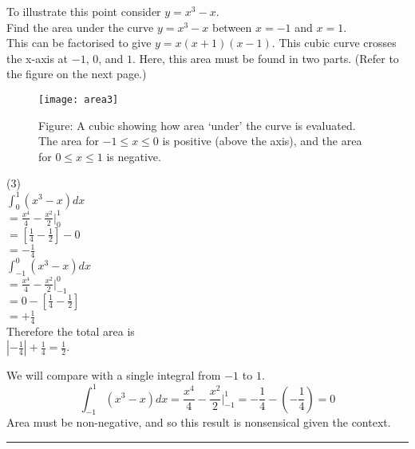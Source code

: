 To illustrate this point consider $y =x^{3} -x$. \medskip\\
\example Find the area under the curve $y =x^{3} -x$ between $x = -1$ and $x =1$.\medskip\\
\solution This can be factorised to give $y =x (x +1) (x -1)$. This cubic curve crosses the x-axis at $ -1$, $0$, and $1$. Here, this area must be found in two parts. (Refer to the figure on the next page.)\clearpage
\begin{SCfigure}[1][h]
	\texttt{[image: area3]}
	\caption*{Figure: A cubic showing how area `under' the curve is evaluated. The area for $-1\leq x\leq 0$ is positive (above the axis), and the area for $0\leq x\leq 1$ is negative.}
\end{SCfigure}
\begin{tasks}(3)
	\task[\phantom{a}]\\ 
	$\int _{0}^{1}(x^{3} -x) dx$\\
	$=\frac{x^4}{4}-\frac{x^2}{2}\vert_{0}^1$\\
	$=[\frac{1}{4}-\frac{1}{2}]-0$\\
	$=-\frac{1}{4}$
	\task[\phantom{a}]\\ 
	$\int _{ -1}^{0}(x^{3} -x) d x$ \\
	$=\frac{x^4}{4}-\frac{x^2}{2}\vert_{-1}^0$\\
	$=0-[\frac{1}{4}-\frac{1}{2}]$\\
	$=+\frac{1}{4}$
	\task[\phantom{a}]\\ 
	Therefore the total area is\\
	 $|-\frac{1}{4}|+\frac{1}{4}=\frac{1}{2}$.
\end{tasks}
We will compare with a single integral from $-1$ to $1$.	
\[\int _{ -1}^{1}(x^{3} -x) d x=\frac{x^4}{4}-\frac{x^2}{2}\vert_{-1}^1 =-\frac{1}{4}-(-\frac{1}{4})=0\]
Area must be non-negative, and so this result is nonsensical given the context.\\  
\rule{6.8cm}{0.5pt}\\
\example 

